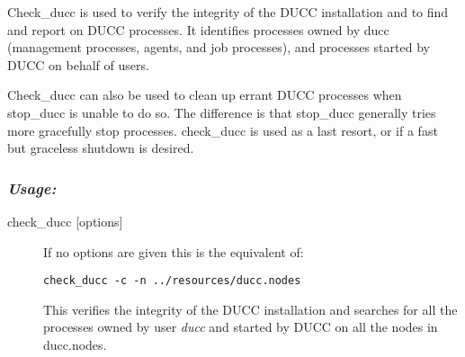     Check\_ducc is used to verify the integrity of the DUCC installation and to find and report on
    DUCC processes. It identifies processes owned by ducc (management processes, agents,
    and job processes), and processes started by DUCC on behalf of users.
    
    Check\_ducc can also be used to clean up errant DUCC processes when stop\_ducc is unable 
    to do so. The difference is that stop\_ducc generally tries more gracefully stop processes. 
    check\_ducc is used as a last resort, or if a fast but graceless shutdown is desired. 
    
    \subsubsection{\em{Usage: }}

        \begin{description} 
          \item[check\_ducc {[options]}]
              If no options are given this is the equivalent of: 
\begin{verbatim}
check_ducc -c -n ../resources/ducc.nodes 
\end{verbatim}
              
              This verifies the integrity of the DUCC installation and searches for all the
              processes owned by user {\em ducc} and started by DUCC on all the nodes in ducc.nodes.
        \end{description}
            
